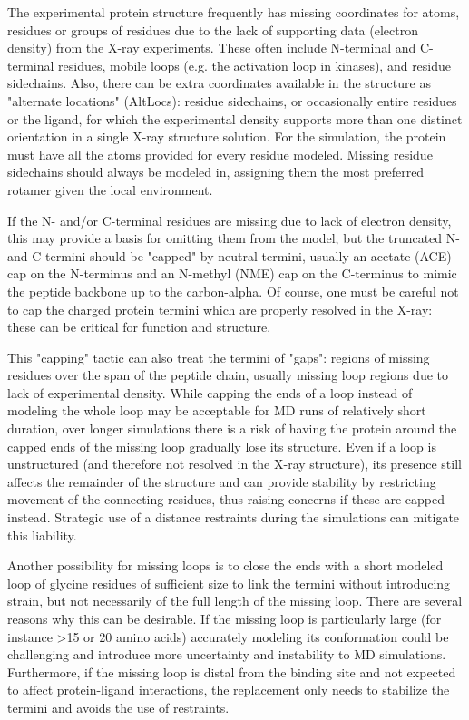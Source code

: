 \documentclass[9pt,bestpractices]{livecoms}
\begin{document}
The experimental protein structure frequently has missing coordinates for atoms, residues or groups of residues due to the lack of supporting data (electron density) from the X-ray experiments. These often include N-terminal and C-terminal residues, mobile loops (e.g. the activation loop in kinases), and residue sidechains. Also, there can be extra coordinates available in the structure as "alternate locations" (AltLocs): residue sidechains, or occasionally entire residues or the ligand, for which the experimental density supports more than one distinct orientation in a single X-ray structure solution. For the simulation, the protein must have all the atoms provided for every residue modeled. Missing residue sidechains should always be modeled in, assigning them the most preferred rotamer given the local environment. 

If the N- and/or C-terminal residues are missing due to lack of electron density, this may provide a basis for omitting them from the model, but the truncated N- and C-termini should be "capped" by neutral termini, usually an acetate (ACE) cap on the N-terminus and an N-methyl (NME) cap on the C-terminus to mimic the peptide backbone up to the carbon-alpha. Of course, one must be careful not to cap the charged protein termini which are properly resolved in the X-ray: these can be critical for function and structure. 

This "capping" tactic can also treat the termini of "gaps": regions of missing residues over the span of the peptide chain, usually missing loop regions due to lack of experimental density. While capping the ends of a loop instead of modeling the whole loop may be acceptable for MD runs of relatively short duration, over longer simulations there is a risk of having the protein around the capped ends of the missing loop gradually lose its structure. Even if a loop is unstructured (and therefore not resolved in the X-ray structure), its presence still affects the remainder of the structure and can provide stability by restricting movement of the connecting residues, thus raising concerns if these are capped instead. Strategic use of a distance restraints during the simulations can mitigate this liability.

Another possibility for missing loops is to close the ends with a short modeled loop of glycine residues of sufficient size to link the termini without introducing strain, but not necessarily of the full length of the missing loop. There are several reasons why this can be desirable. If the missing loop is particularly large (for instance >15 or 20 amino acids) accurately modeling its conformation could be challenging and introduce more uncertainty and instability to MD simulations. Furthermore, if the missing loop is distal from the binding site and not expected to affect protein-ligand interactions, the replacement only needs to stabilize the termini and avoids the use of restraints. 
\end{document}
